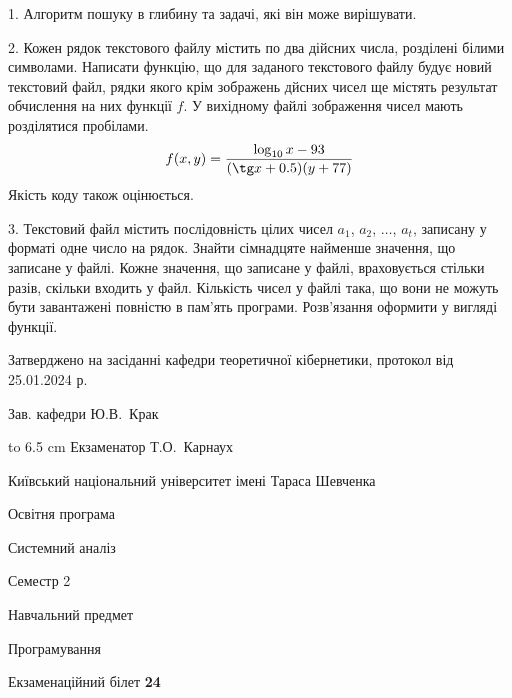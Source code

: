 \documentclass[12pt, ukrainian]{article}
\begin{document}
{%
1. Алгоритм пошуку в глибину та задачі, які він може вирішувати.%
\par
\vspace{2mm}

2. Кожен рядок текстового файлу містить по два дійсних числа, розділені білими символами.
Написати функцію, що для заданого текстового файлу будує новий текстовий файл, рядки якого крім зображень дйсних чисел ще містять результат обчислення на них функції $f$. У вихідному файлі зображення чисел мають розділятися пробілами. 
$$f(x, y) =\frac{\log_{10} x - 93}{(\tg x + 0.5) (y + 77)}$$ 
Якість коду також оцінюється.

\par
\vspace{2mm}

3. Текстовий файл містить послідовність цілих чисел $a_1$, $a_2$, $\ldots$, $a_t$, записану у форматі одне число на рядок. Знайти сімнадцяте найменше значення, що записане у файлі. Кожне значення, що записане у файлі, враховується стільки разів, скільки входить у файл. Кількість чисел у файлі така, що вони не можуть бути завантажені повністю в пам'ять програми. Розв'язання оформити у вигляді функції.

}
{\smallskip\smallskip \begin {scriptsize} Затверджено на засіданні кафедри теоретичної кібернетики, протокол   від   25.01.2024 р.\par\smallskip\smallskip\smallskip\smallskip
{\parbox {6.5 cm} {Зав. кафедри \dotfill Ю.В.~Крак}}\hspace {0.7cm} {\hbox to 6.5 cm { Екзаменатор \dotfill Т.О.~Карнаух}} \end{scriptsize}}
\vspace{0.9cm}
{{\begin {scriptsize}\par
{ \center  Київський національний університет імені Тараса Шевченка \par}
{\parbox {5 cm}{Освітня програма \hfill}{\parbox {7 cm}{Системний аналіз\hfill}}\parbox {6 cm}{\hfill Семестр 2}}\par
{\parbox {5 cm} {Навчальний предмет \hfill}\parbox {7 cm}{Програмування \hfill}\parbox {6cm}{\hfill}\par}\vspace{-15pt} \end{scriptsize}}{\center Екзаменаційний білет \No \textbf { 24 }\par}}
\end{document}
